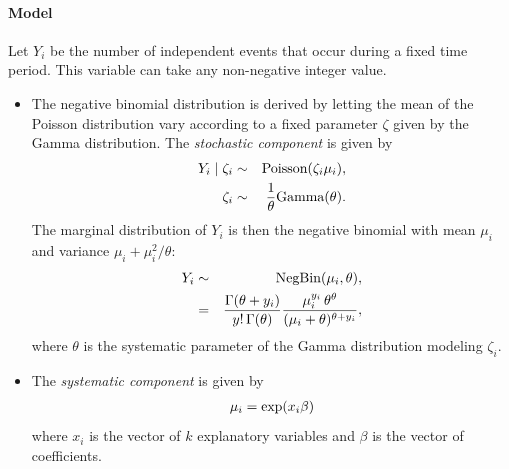 \documentclass[letterpaper,10pt,english]{sphinxmanual}
\begin{document}
\paragraph{Model}
\label{zelig-negbin:model}
Let \(Y_i\) be the number of independent events that occur during a
fixed time period. This variable can take any non-negative integer
value.
\begin{itemize}
\item {} 
The negative binomial distribution is derived by letting the mean of
the Poisson distribution vary according to a fixed parameter
\(\zeta\) given by the Gamma distribution. The \emph{stochastic
component} is given by
\begin{gather}
\begin{split}\begin{aligned}
     Y_i \mid \zeta_i & \sim & \textrm{Poisson}(\zeta_i \mu_i),\\
     \zeta_i & \sim & \frac{1}{\theta}\textrm{Gamma}(\theta).
   \end{aligned}\end{split}\notag
\end{gather}
The marginal distribution of \(Y_i\) is then the negative
binomial with mean \(\mu_i\) and variance
\(\mu_i + \mu_i^2/\theta\):
\begin{gather}
\begin{split}\begin{aligned}
   Y_i & \sim & \textrm{NegBin}(\mu_i, \theta), \\
       & = & \frac{\Gamma (\theta + y_i)}{y! \, \Gamma(\theta)}
             \frac{\mu_i^{y_i} \, \theta^{\theta}}{(\mu_i + \theta)^{\theta + y_i}},
   \end{aligned}\end{split}\notag
\end{gather}
where \(\theta\) is the systematic parameter of the Gamma
distribution modeling \(\zeta_i\).

\item {} 
The \emph{systematic component} is given by
\begin{gather}
\begin{split}\mu_i = \exp(x_i \beta)\end{split}\notag
\end{gather}
where \(x_i\) is the vector of \(k\) explanatory variables
and \(\beta\) is the vector of coefficients.

\end{itemize}
\end{document}
